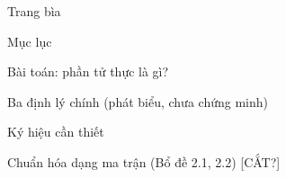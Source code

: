 

\begin{frame}{Trang bìa}
\note{
}
\end{frame}

\begin{frame}{Mục lục}
\note{
}
\end{frame}


\begin{frame}{Bài toán: phần tử thực là gì?}
\note{
}
\end{frame}

\begin{frame}{Ba định lý chính (phát biểu, chưa chứng minh)}
\note{
}
\end{frame}


\begin{frame}{Ký hiệu cần thiết}
\note{
}
\end{frame}

\begin{frame}{Chuẩn hóa dạng ma trận (Bổ đề 2.1, 2.2) [CẮT?]}
\note{
}
\end{frame}

